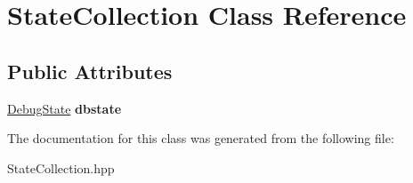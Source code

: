 \hypertarget{class_state_collection}{}\section{State\+Collection Class Reference}
\label{class_state_collection}
\subsection*{Public Attributes}
\begin{DoxyCompactItemize}
\item 
\hyperlink{class_debug_state}{Debug\+State} {\bfseries dbstate}\hypertarget{class_state_collection_a906c67b622d68452ea020554dc69fe36}{}\label{class_state_collection_a906c67b622d68452ea020554dc69fe36}

\end{DoxyCompactItemize}


The documentation for this class was generated from the following file\+:\begin{DoxyCompactItemize}
\item 
State\+Collection.\+hpp\end{DoxyCompactItemize}
